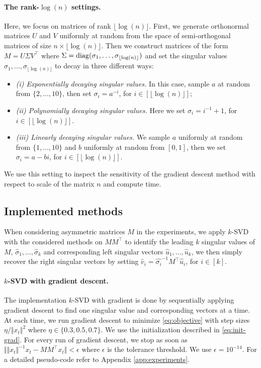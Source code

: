\paragraph{The rank-$\log(n)$ settings.} Here, we focus on matrices of rank  $\lfloor \log(n) \rfloor $. First, we generate orthonormal matrices $U$ and $V$ uniformly at random from the space of semi-orthogonal matrices of size $n \times \lfloor \log (n) \rfloor$. Then we construct matrices of the form  $M = U \Sigma V^\top$ where $\Sigma = \operatorname{diag}(\sigma_1, \dots, \sigma_{\lfloor \log(n) \rfloor})$ and set the singular values $\sigma_1, \dots, \sigma_{\lfloor \log(n) \rfloor}$ to decay in three different ways: 
\begin{itemize}
    \item \emph{(i) Exponentially decaying singular values.} In this case, sample $a$ at random from $\lbrace 2, \dots, 10\rbrace$, then set $\sigma_i = a^{-i}$, for $i \in [\lfloor\log(n) \rfloor]$; 
    \item \emph{(ii) Polynomially decaying singular values.} Here we set $\sigma_i = i^{-1} + 1$, for $i \in [\lfloor\log(n) \rfloor]$.
    \item \emph{(iii) Linearly decaying singular values.} We sample $a $ uniformly at random from $\lbrace 1, \dots, 10\rbrace$ and $b$ uniformly at random from $[0,1]$, then we set $\sigma_i = a - b i$, for $i \in [\lfloor\log(n) \rfloor]$.
\end{itemize}
We use this setting to inspect the sensitivity of the gradient descent method with respect to scale of the matrix $n$ and compute time. 




\subsection{Implemented methods} 

When considering asymmetric matrices $M$ in the experiments, we apply $k$-SVD with the considered methods on $M M^\top$ to identify the leading $k$ singular values of $M$, $\hat{\sigma}_1, \dots, \hat{\sigma}_k$ and corresponding left singular vectors $\hat{u}_1, \dots, \hat{u}_k$, we then simply recover the right singular vectors by setting $\hat{v}_i = \hat{\sigma_i}^{-1} M^\top \hat{u}_i$, for $i \in [k]$. 


\paragraph{$k$-SVD with gradient descent.} The implementation $k$-SVD  with gradient is done by sequentially applying gradient descent to find one singular value and corresponding vectors at a time. At each time, we run gradient descent to minimize \eqref{eq:objective} with step sizes $\eta/\Vert x_t \Vert^2$ where $\eta \in \lbrace 0.3, 0.5, 0.7 \rbrace$. We use the initialization described in \eqref{eq:init-grad}. For every run of gradient descent, we stop as soon as $\Vert \Vert x_t \Vert^{-1} x_{t} - M M^\top x_t \Vert < \epsilon$ where $\epsilon$ is the tolerance threshold. We use $\epsilon = 10^{-14}$.  For a detailed pseudo-code refer to Appendix \ref{app:experiments}.


